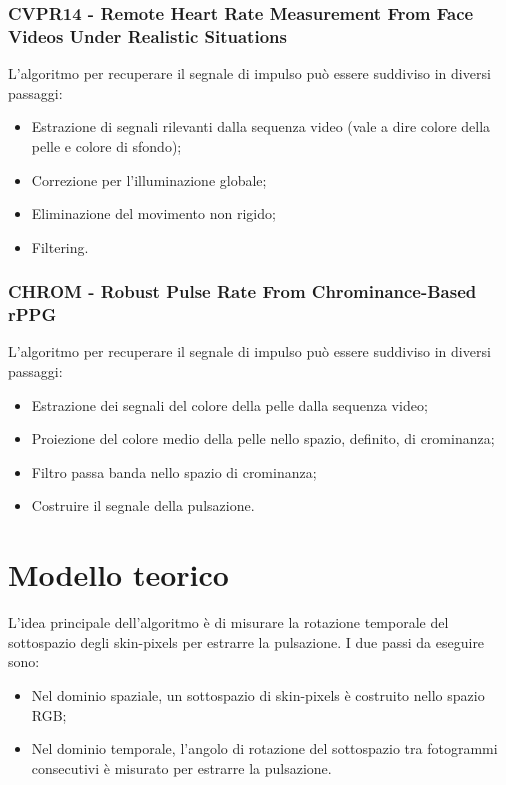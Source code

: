 \documentclass[journal,A4paper,compsoc,epsfig]{IEEEtran}
\begin{document}
      \subsubsection{CVPR14 - Remote Heart Rate Measurement From Face Videos Under Realistic Situations \cite{Li:2014}}
        L'algoritmo per recuperare il segnale di impulso può essere suddiviso in diversi passaggi:
        \begin{itemize}
          \item Estrazione di segnali rilevanti dalla sequenza video (vale a dire colore della pelle e colore di sfondo);
          \item Correzione per l'illuminazione globale;
          \item Eliminazione del movimento non rigido;
          \item Filtering.
        \end{itemize}

      \subsubsection{CHROM - Robust Pulse Rate From Chrominance-Based rPPG \cite{deHaan:2013}}
        L'algoritmo per recuperare il segnale di impulso può essere suddiviso in diversi passaggi:
        \begin{itemize}
          \item Estrazione dei segnali del colore della pelle dalla sequenza video;
          \item Proiezione del colore medio della pelle nello spazio, definito, di crominanza;
          \item Filtro passa banda nello spazio di crominanza;
          \item Costruire il segnale della pulsazione.
        \end{itemize}
  
  \section{Modello teorico}
    \label{sec:Modello}
    L'idea principale dell'algoritmo è di misurare la rotazione temporale del sottospazio degli skin-pixels per estrarre la pulsazione.
    I due passi da eseguire sono:
    \begin{itemize}
      \item Nel dominio spaziale, un sottospazio di skin-pixels è costruito nello spazio RGB;
      \item Nel dominio temporale, l'angolo di rotazione del sottospazio tra fotogrammi consecutivi è misurato per estrarre la pulsazione.
    \end{itemize}
    
\end{document}
